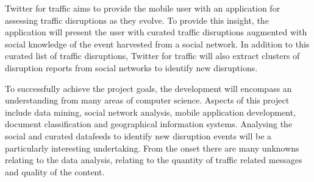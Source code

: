 Twitter for traffic aims to provide the mobile user with an application for assessing traffic disruptions as they evolve. To provide this insight, the application will present the user with curated traffic disruptions augmented with social knowledge of the event harvested from a social network. In addition to this curated list of traffic disruptions, Twitter for traffic will also extract clusters of disruption reports from social networks to identify new disruptions.

To successfully achieve the project goals, the development will encompass an understanding from many areas of computer science. Aspects of this project include data mining, social network analysis, mobile application development, document classification and geographical information systems. Analysing the social and curated datafeeds to identify new disruption events will be a particularly interesting undertaking. From the onset there are many unknowns relating to the data analysis, relating to the quantity of traffic related messages and quality of the content. 
